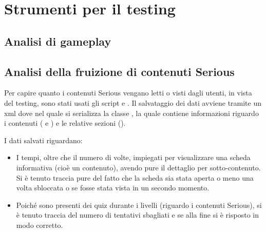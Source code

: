 \section{Strumenti per il testing}

\subsection{Analisi di gameplay}

\subsection{Analisi della fruizione di contenuti Serious}
\label{analisiFruizione}

Per capire quanto i contenuti Serious vengano letti o visti dagli utenti, in vista del testing, sono stati usati gli script  e . Il salvataggio dei dati avviene tramite un xml dove nel quale si serializza la classe , la quale contiene informazioni riguardo i contenuti ( e ) e le relative sezioni ().

I dati salvati riguardano:

\begin{itemize}

\item I tempi, oltre che il numero di volte, impiegati per visualizzare una scheda informativa (cioè un contenuto), avendo pure il dettaglio per sotto-contenuto. Si è tenuto traccia pure del fatto che la scheda sia stata aperta o meno una volta sbloccata o se fosse stata vista in un secondo momento.
\item Poiché sono presenti dei quiz durante i livelli (riguardo i contenuti Serious), si è tenuto traccia del numero di tentativi sbagliati e se alla fine si è risposto in modo corretto.

\end{itemize}

\newpage
